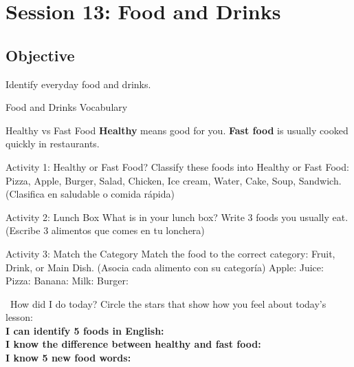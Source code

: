 \section*{Session 13: Food and Drinks}

\subsection*{Objective}
Identify everyday food and drinks.

\begin{vocabcard}{Food and Drinks Vocabulary}
\end{vocabcard}

\begin{grammartip}{Healthy vs Fast Food}
  \textbf{Healthy} means good for you. \textbf{Fast food} is usually cooked quickly in restaurants.
\end{grammartip}

\begin{activity}{Activity 1: Healthy or Fast Food?}
  Classify these foods into Healthy or Fast Food: Pizza, Apple, Burger, Salad, Chicken, Ice cream, Water, Cake, Soup, Sandwich. (Clasifica en saludable o comida rápida)
  \writinglines[4]
\end{activity}

\begin{activity}{Activity 2: Lunch Box}
  What is in your lunch box? Write 3 foods you usually eat. (Escribe 3 alimentos que comes en tu lonchera)
  \writinglines[3]
\end{activity}

\begin{activity}{Activity 3: Match the Category}
  Match the food to the correct category: Fruit, Drink, or Main Dish. (Asocia cada alimento con su categoría)
  Apple: \answerline[3cm]
  Juice: \answerline[3cm]
  Pizza: \answerline[3cm]
  Banana: \answerline[3cm]
  Milk: \answerline[3cm]
  Burger: \answerline[3cm]
\end{activity}

\vspace{1em}
\begin{grammartip}{ \ How did I do today?}
  Circle the stars that show how you feel about today's lesson:\\[6pt]
  \textbf{I can identify 5 foods in English:} \selfcheck[0] \\[4pt]
  \textbf{I know the difference between healthy and fast food:} \selfcheck[0] \\[4pt]
  \textbf{I know 5 new food words:} \selfcheck[0]
\end{grammartip}

